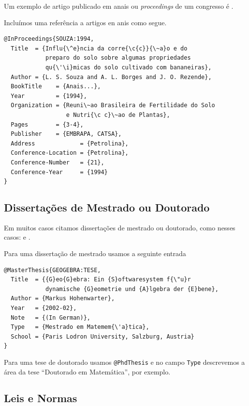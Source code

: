\documentclass[fleqn]{profmat-cefet}
\begin{document}
Um exemplo de artigo publicado em anais ou \textit{proceedings} 
de um congresso é \citeauthor{SOUZA:1994}.

Incluímos uma referência a artigos en anis como segue.
\begin{lstlisting}
@InProceedings{SOUZA:1994,
  Title  = {Influ{\^e}ncia da corre{\c{c}}{\~a}o e do
            preparo do solo sobre algumas propriedades
            qu{\'\i}micas do solo cultivado com bananeiras},
  Author = {L. S. Souza and A. L. Borges and J. O. Rezende},
  BookTitle    = {Anais...},
  Year         = {1994},
  Organization = {Reuni\~ao Brasileira de Fertilidade do Solo
                  e Nutri{\c c}\~ao de Plantas},
  Pages        = {3-4},
  Publisher    = {EMBRAPA, CATSA},
  Address             = {Petrolina},
  Conference-Location = {Petrolina},
  Conference-Number   = {21},
  Conference-Year     = {1994}
}
\end{lstlisting}

\subsection{Dissertações de Mestrado ou Doutorado}

Em muitos casos citamos dissertações de mestrado ou doutorado, como nesses casos:
\citeauthor{GEOGEBRA:TESE} e
\citeauthor{SOUZA:Bayesiana}.

Para uma dissertação de mestrado usamos a seguinte entrada
\begin{lstlisting}
@MasterThesis{GEOGEBRA:TESE,
  Title  = {{G}eo{G}ebra: Ein {S}oftwaresystem f{\"u}r 
            dynamische {G}eometrie und {A}lgebra der {E}bene},
  Author = {Markus Hohenwarter},
  Year   = {2002-02},
  Note   = {(In German)},
  Type   = {Mestrado em Matemem{\'a}tica},
  School = {Paris Lodron University, Salzburg, Austria}
}
\end{lstlisting}

Para uma tese de doutorado usamos \lstinline|@PhdThesis|
e no campo \lstinline|Type| descrevemos a área da tese 
``Doutorado em Matemática'', por exemplo.
    
\subsection{Leis e Normas}
\end{document}
